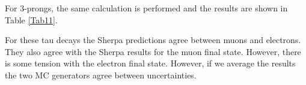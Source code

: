 For 3-prongs, the same calculation is performed and the results are shown in Table \ref{Tab11}.
\begin{table}[]
	\centering
	\caption{MC signal yield comparisons. 3-prong taus.}
	\label{Tab11}
\end{table}
For these tau decays the Sherpa predictions agree between muons and electrons. They also agree with the Sherpa results for the muon final state. However, there is some tension with the electron final state. However, if we average the results the two MC generators agree between uncertainties.
